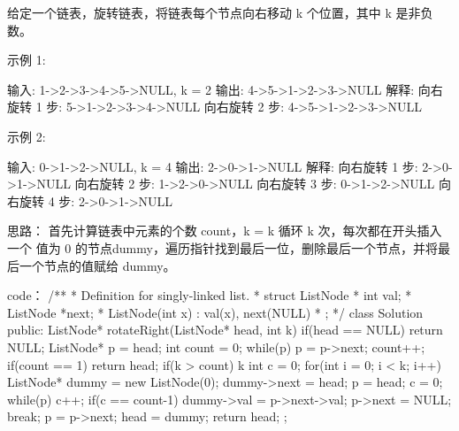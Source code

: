给定一个链表，旋转链表，将链表每个节点向右移动 k 个位置，其中 k 是非负数。

示例 1:

输入: 1->2->3->4->5->NULL, k = 2
输出: 4->5->1->2->3->NULL
解释:
向右旋转 1 步: 5->1->2->3->4->NULL
向右旋转 2 步: 4->5->1->2->3->NULL

示例 2:

输入: 0->1->2->NULL, k = 4
输出: 2->0->1->NULL
解释:
向右旋转 1 步: 2->0->1->NULL
向右旋转 2 步: 1->2->0->NULL
向右旋转 3 步: 0->1->2->NULL
向右旋转 4 步: 2->0->1->NULL

























思路：
首先计算链表中元素的个数 count，k = k %
循环 k 次，每次都在开头插入一个 值为 0 的节点dummy，遍历指针找到最后一位，删除最后一个节点，并将最后一个节点的值赋给 dummy。






























code：
/**
 * Definition for singly-linked list.
 * struct ListNode {
 *     int val;
 *     ListNode *next;
 *     ListNode(int x) : val(x), next(NULL) {}
 * };
 */
class Solution {
public:
    ListNode* rotateRight(ListNode* head, int k) {
        if(head == NULL) return NULL;
        ListNode* p = head;
        int count = 0;
        while(p)
        {
            p = p->next; count++;
        }
        if(count == 1) return head;
        if(k > count) k %
        int c = 0;
        for(int i = 0; i < k; i++)
        {
            ListNode* dummy = new ListNode(0);
            dummy->next = head;
            p = head;
            c = 0;
            while(p)
            {
                c++;
                if(c == count-1) 
                {
                    dummy->val = p->next->val;
                    p->next = NULL;  break;
                }
                p = p->next;
            }
            head = dummy;
        }
        return head;
    }
};